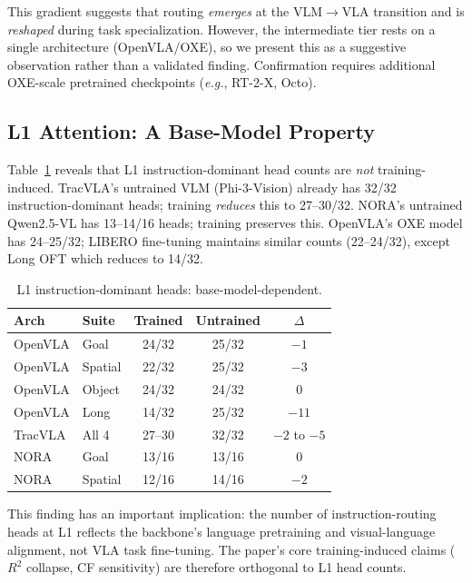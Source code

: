 \documentclass[10pt,twocolumn]{article}
\newcommand{\eg}{\textit{e.g.}}
\begin{document}
This gradient suggests that routing \emph{emerges} at the VLM$\to$VLA transition and is \emph{reshaped} during task specialization. However, the intermediate tier rests on a single architecture (OpenVLA/OXE), so we present this as a suggestive observation rather than a validated finding. Confirmation requires additional OXE-scale pretrained checkpoints (\eg, RT-2-X, Octo).

\subsection{L1 Attention: A Base-Model Property}
\label{sec:l1}

Table~\ref{tab:l1heads} reveals that L1 instruction-dominant head counts are \emph{not} training-induced.
TracVLA's untrained VLM (Phi-3-Vision) already has 32/32 instruction-dominant heads; training \emph{reduces} this to 27--30/32.
NORA's untrained Qwen2.5-VL has 13--14/16 heads; training preserves this.
OpenVLA's OXE model has 24--25/32; LIBERO fine-tuning maintains similar counts (22--24/32), except Long OFT which reduces to 14/32.

\begin{table}[t]
\centering
\caption{L1 instruction-dominant heads: base-model-dependent.}
\label{tab:l1heads}
\small
\begin{tabular}{@{}llccc@{}}
\toprule
\textbf{Arch} & \textbf{Suite} & \textbf{Trained} & \textbf{Untrained} & \textbf{$\Delta$} \\
\midrule
OpenVLA & Goal & 24/32 & 25/32 & $-1$ \\
OpenVLA & Spatial & 22/32 & 25/32 & $-3$ \\
OpenVLA & Object & 24/32 & 24/32 & 0 \\
OpenVLA & Long & 14/32 & 25/32 & $-11$ \\
TracVLA & All 4 & 27--30 & 32/32 & $-2$ to $-5$ \\
NORA & Goal & 13/16 & 13/16 & 0 \\
NORA & Spatial & 12/16 & 14/16 & $-2$ \\
\bottomrule
\end{tabular}
\end{table}

This finding has an important implication: the number of instruction-routing heads at L1 reflects the backbone's language pretraining and visual-language alignment, not VLA task fine-tuning.
The paper's core training-induced claims ($R^2$ collapse, CF sensitivity) are therefore orthogonal to L1 head counts.
\end{document}
